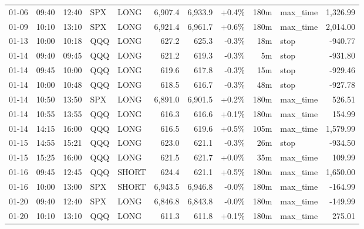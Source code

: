 \documentclass[11pt,a4paper,twoside]{article}
\begin{document}
\begin{center}
\begin{longtable}{>{\color{txtmain}}l l l l l r r r r >{\color{txtmain}}l r}
01-06 & 09:40 & 12:40 & SPX & LONG & 6,907.4 & 6,933.9 & \textcolor{wingreen}{+0.4\%} & 180m & max\_time & \textcolor{wingreen}{1,326.99} \\
01-09 & 10:10 & 13:10 & SPX & LONG & 6,921.4 & 6,961.7 & \textcolor{wingreen}{+0.6\%} & 180m & max\_time & \textcolor{wingreen}{2,014.00} \\
01-13 & 10:00 & 10:18 & QQQ & LONG & 627.2 & 625.3 & \textcolor{lossred}{-0.3\%} & 18m & stop & \textcolor{lossred}{-940.77} \\
01-14 & 09:40 & 09:45 & QQQ & LONG & 621.2 & 619.3 & \textcolor{lossred}{-0.3\%} & 5m & stop & \textcolor{lossred}{-931.80} \\
01-14 & 09:45 & 10:00 & QQQ & LONG & 619.6 & 617.8 & \textcolor{lossred}{-0.3\%} & 15m & stop & \textcolor{lossred}{-929.46} \\
01-14 & 10:00 & 10:48 & QQQ & LONG & 618.5 & 616.7 & \textcolor{lossred}{-0.3\%} & 48m & stop & \textcolor{lossred}{-927.78} \\
01-14 & 10:50 & 13:50 & SPX & LONG & 6,891.0 & 6,901.5 & \textcolor{wingreen}{+0.2\%} & 180m & max\_time & \textcolor{wingreen}{526.51} \\
01-14 & 10:55 & 13:55 & QQQ & LONG & 616.3 & 616.6 & \textcolor{wingreen}{+0.1\%} & 180m & max\_time & \textcolor{wingreen}{154.99} \\
01-14 & 14:15 & 16:00 & QQQ & LONG & 616.5 & 619.6 & \textcolor{wingreen}{+0.5\%} & 105m & max\_time & \textcolor{wingreen}{1,579.99} \\
01-15 & 14:55 & 15:21 & QQQ & LONG & 623.0 & 621.1 & \textcolor{lossred}{-0.3\%} & 26m & stop & \textcolor{lossred}{-934.50} \\
01-15 & 15:25 & 16:00 & QQQ & LONG & 621.5 & 621.7 & \textcolor{wingreen}{+0.0\%} & 35m & max\_time & \textcolor{wingreen}{109.99} \\
01-16 & 09:45 & 12:45 & QQQ & SHORT & 624.4 & 621.1 & \textcolor{wingreen}{+0.5\%} & 180m & max\_time & \textcolor{wingreen}{1,650.00} \\
01-16 & 10:00 & 13:00 & SPX & SHORT & 6,943.5 & 6,946.8 & \textcolor{lossred}{-0.0\%} & 180m & max\_time & \textcolor{lossred}{-164.99} \\
01-20 & 09:40 & 12:40 & SPX & LONG & 6,846.8 & 6,843.8 & \textcolor{lossred}{-0.0\%} & 180m & max\_time & \textcolor{lossred}{-149.99} \\
01-20 & 10:10 & 13:10 & QQQ & LONG & 611.3 & 611.8 & \textcolor{wingreen}{+0.1\%} & 180m & max\_time & \textcolor{wingreen}{275.01} \\

\end{longtable}
\end{center}
\end{document}
